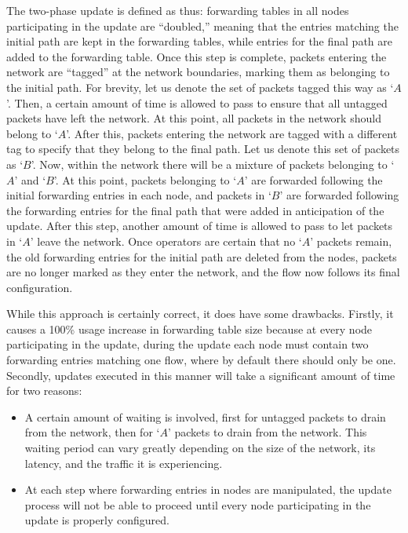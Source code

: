 \documentclass[pageno]{jpaper}
\begin{document}
The two-phase update is defined as thus: forwarding tables in all nodes participating in the update are ``doubled,'' meaning that the entries matching the initial path are kept in the forwarding tables, while entries for the final path are added to the forwarding table. Once this step is complete, packets entering the network are ``tagged'' at the network boundaries, marking them as belonging to the initial path. For brevity, let us denote the set of packets tagged this way as `$A$'. Then, a certain amount of time is allowed to pass to ensure that all untagged packets have left the network. At this point, all packets in the network should belong to `$A$'. After this, packets entering the network are tagged with a different tag to specify that they belong to the final path. Let us denote this set of packets as `$B$'. Now, within the network there will be a mixture of packets belonging to `$A$' and `$B$'. At this point, packets belonging to `$A$' are forwarded following the initial forwarding entries in each node, and packets in `$B$' are forwarded following the forwarding entries for the final path that were added in anticipation of the update. After this step, another amount of time is allowed to pass to let packets in `$A$' leave the network. Once operators are certain that no `$A$' packets remain, the old forwarding entries for the initial path are deleted from the nodes, packets are no longer marked as they enter the network, and the flow now follows its final configuration.

While this approach is certainly correct, it does have some drawbacks. Firstly, it causes a 100\% usage increase in forwarding table size because at every node participating in the update, during the update each node must contain two forwarding entries matching one flow, where by default there should only be one. Secondly, updates executed in this manner will take a significant amount of time for two reasons:
\begin{itemize}
\item A certain amount of waiting is involved, first for untagged packets to drain from the network, then for `$A$' packets to drain from the network. This waiting period can vary greatly depending on the size of the network, its latency, and the traffic it is experiencing.
\item At each step where forwarding entries in nodes are manipulated, the update process will not be able to proceed until every node participating in the update is properly configured.
\end{itemize}
\end{document}
